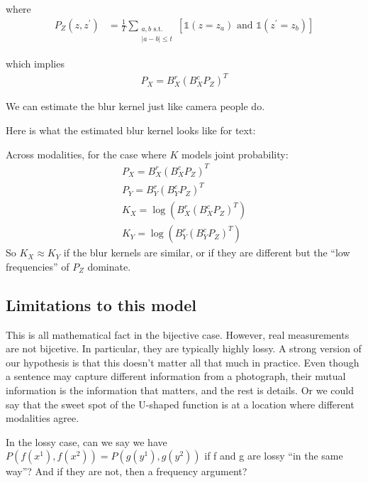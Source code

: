 where
\begin{align}
    P_Z(z, z^{\prime}) &= \frac{1}{T} \underset{\substack{a,b \text{ s.t. }\\ |a-b| \leq t}}\sum [\mathds{1}(z = z_a) \text{ and } \mathds{1}(z^{\prime} = z_b)]
\end{align}

which implies
\begin{align}
    P_X = B^r_X (B^c_X P_Z)^T
\end{align}

We can estimate the blur kernel just like camera people do.

Here is what the estimated blur kernel looks like for text:

Across modalities, for the case where $K$ models joint probability:
\begin{align}
    P_X = B^r_X (B^c_X P_Z)^T\\
    P_Y = B^r_Y (B^c_Y P_Z)^T\\
    K_X = \log (B^r_X (B^c_X P_Z)^T)\\
    K_Y = \log (B^r_Y (B^c_Y P_Z)^T)
\end{align}
So $K_X \approx K_Y$ if the blur kernels are similar, or if they are different but the ``low frequencies'' of $P_Z$ dominate.

\subsection{Limitations to this model}


This is all mathematical fact in the bijective case. However, real measurements are not bijcetive. In particular, they are typically highly lossy. A strong version of our hypothesis is that this doesn't matter all that much in practice. Even though a sentence may capture different information from a photograph, their mutual information is the information that matters, and the rest is details. Or we could say that the sweet spot of the U-shaped function is at a location where different modalities agree.

In the lossy case, can we say we have $P(f(x^1), f(x^2)) = P(g(y^1), g(y^2))$ if f and g are lossy ``in the same way''? And if they are not, then a frequency argument?



